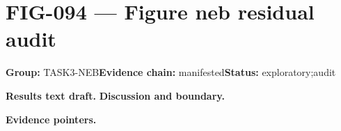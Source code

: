 \clearpage
\section{FIG-094 --- Figure neb residual audit}
\label{figpage:fig-094}
\textbf{Group:} TASK3-NEB\quad \textbf{Evidence chain:} manifested\quad \textbf{Status:} exploratory;audit

\textbf{Results text draft.} 
\textbf{Discussion and boundary.} 


\textbf{Evidence pointers.}



\vfill

